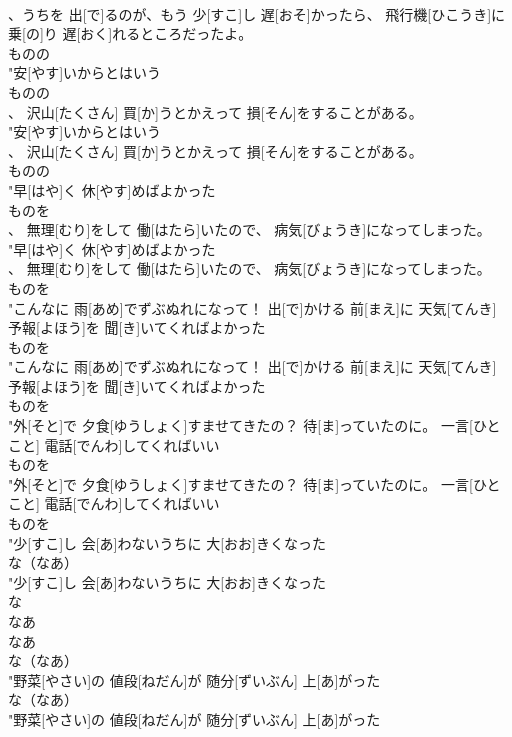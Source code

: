 \documentclass[8pt]{extreport}
\begin{document}
\begin{CJK}{UTF8}{min}
\\	、うちを 出[で]るのが、もう 少[すこ]し 遅[おそ]かったら、 飛行機[ひこうき]に 乗[の]り 遅[おく]れるところだったよ。
\\	ものの
\\	"安[やす]いからとはいう
\\	ものの
\\	、 沢山[たくさん] 買[か]うとかえって 損[そん]をすることがある。
\\	"安[やす]いからとはいう
\\	、 沢山[たくさん] 買[か]うとかえって 損[そん]をすることがある。
\\	ものの
\\	"早[はや]く 休[やす]めばよかった
\\	ものを
\\	、 無理[むり]をして 働[はたら]いたので、 病気[びょうき]になってしまった。
\\	"早[はや]く 休[やす]めばよかった
\\	、 無理[むり]をして 働[はたら]いたので、 病気[びょうき]になってしまった。
\\	ものを
\\	"こんなに 雨[あめ]でずぶぬれになって！ 出[で]かける 前[まえ]に 天気[てんき] 予報[よほう]を 聞[き]いてくればよかった
\\	ものを
\\	"こんなに 雨[あめ]でずぶぬれになって！ 出[で]かける 前[まえ]に 天気[てんき] 予報[よほう]を 聞[き]いてくればよかった
\\	ものを
\\	"外[そと]で 夕食[ゆうしょく]すませてきたの？ 待[ま]っていたのに。 一言[ひとこと] 電話[でんわ]してくればいい
\\	ものを
\\	"外[そと]で 夕食[ゆうしょく]すませてきたの？ 待[ま]っていたのに。 一言[ひとこと] 電話[でんわ]してくればいい
\\	ものを
\\	"少[すこ]し 会[あ]わないうちに 大[おお]きくなった
\\	な（なあ）
\\	"少[すこ]し 会[あ]わないうちに 大[おお]きくなった
\\	な 
\\	なあ 
\\	なあ 
\\	な（なあ）
\\	"野菜[やさい]の 値段[ねだん]が 随分[ずいぶん] 上[あ]がった
\\	な（なあ）
\\	"野菜[やさい]の 値段[ねだん]が 随分[ずいぶん] 上[あ]がった

\end{CJK}
\end{document}
